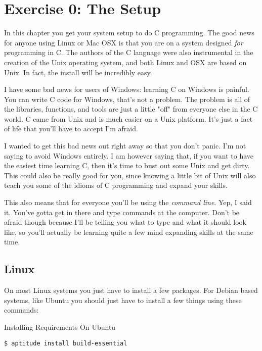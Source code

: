 \chapter{Exercise 0: The Setup}

In this chapter you get your system setup to do C programming.  The
good news for anyone using Linux or Mac OSX is that you are on a
system designed \emph{for} programming in C.  The authors of the
C language were also instrumental in the creation of the Unix operating
system, and both Linux and OSX are based on Unix.  In fact, the install
will be incredibly easy.

I have some bad news for users of Windows:  learning C on Windows
is painful.  You can write C code for Windows, that's not a problem.
The problem is all of the libraries, functions, and tools are just
a little "off" from everyone else in the C world.  C came from
Unix and is much easier on a Unix platform.  It's just a fact 
of life that you'll have to accept I'm afraid.

I wanted to get this bad news out right away so that you don't
panic.  I'm not saying to avoid Windows entirely.  I am however
saying that, if you want to have the easiest time learning C, then
it's time to bust out some Unix and get dirty.  This could also
be really good for you, since knowing a little bit of Unix will
also teach you some of the idioms of C programming and expand
your skills.

This also means that for everyone you'll be using the 
\emph{command line}.  Yep, I said it.  You've gotta get in there and
type commands at the computer.  Don't be afraid though because
I'll be telling you what to type and what it should look like,
so you'll actually be learning quite a few mind expanding 
skills at the same time.

\section{Linux}

On most Linux systems you just have to install a few packages.  For 
Debian based systems, like Ubuntu you should just have to install
a few things using these commands:

\begin{code}{Installing Requirements On Ubuntu}
\begin{lstlisting}
$ aptitude install build-essential
\end{lstlisting}
\end{code}


